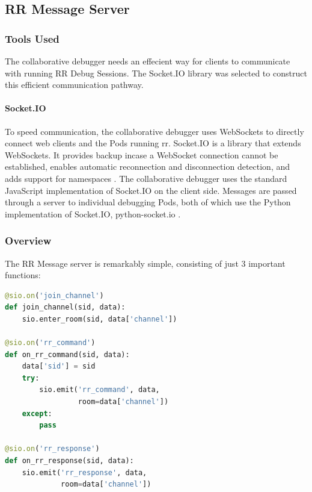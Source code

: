 \documentclass[12pt]{article}
\begin{document}
\subsection{RR Message Server}\label{rrmessageserver}

\subsubsection{Tools Used}

The collaborative debugger needs an effecient way for clients to
communicate with running RR Debug Sessions. The Socket.IO library was
selected to construct this efficient communication pathway.

\paragraph{Socket.IO}\label{socketio}

To speed communication, the collaborative debugger uses WebSockets to
directly connect web clients and the Pods running rr.  Socket.IO is a
library that extends WebSockets.  It provides backup incase a
WebSocket connection cannot be established, enables automatic
reconnection and disconnection detection, and adds support for
namespaces \cite{socketio}.  The collaborative debugger uses the
standard JavaScript implementation of Socket.IO on the client side.
Messages are passed through a server to individual debugging Pods,
both of which use the Python implementation of Socket.IO,
python-socket.io \cite{python_socketio}.

\subsubsection{Overview}

The RR Message server is remarkably simple, consisting of just 3
important functions:

\begin{lstlisting}[language=Python,basicstyle=\linespread{0.5}\ttfamily,caption={RR Message Server},captionpos=b]
@sio.on('join_channel')
def join_channel(sid, data):
    sio.enter_room(sid, data['channel'])

@sio.on('rr_command')
def on_rr_command(sid, data):
    data['sid'] = sid
    try:
        sio.emit('rr_command', data,
                 room=data['channel'])
    except:
        pass

@sio.on('rr_response')
def on_rr_response(sid, data):
    sio.emit('rr_response', data,
             room=data['channel'])
\end{lstlisting}
\end{document}
